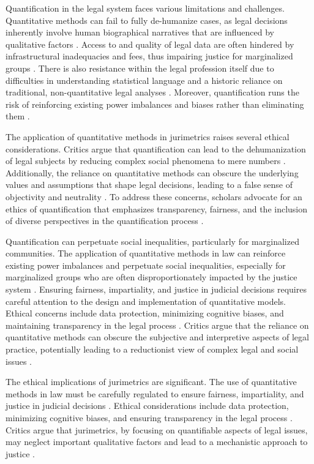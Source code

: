 Quantification in the legal system faces various limitations and challenges. Quantitative methods can fail to fully de-humanize cases, as legal decisions inherently involve human biographical narratives that are influenced by qualitative factors \cite{lynch2019, lynch2019}. Access to and quality of legal data are often hindered by infrastructural inadequacies and fees, thus impairing justice for marginalized groups \cite{ribeiro2021}. There is also resistance within the legal profession itself due to difficulties in understanding statistical language and a historic reliance on traditional, non-quantitative legal analyses \cite{maia2019, ribeiro2021}. Moreover, quantification runs the risk of reinforcing existing power imbalances and biases rather than eliminating them \cite{lynch2019}.

The application of quantitative methods in jurimetrics raises several ethical considerations. Critics argue that quantification can lead to the dehumanization of legal subjects by reducing complex social phenomena to mere numbers \cite{101111lsi12334}. Additionally, the reliance on quantitative methods can obscure the underlying values and assumptions that shape legal decisions, leading to a false sense of objectivity and neutrality \cite{101057s4159902003965}. To address these concerns, scholars advocate for an ethics of quantification that emphasizes transparency, fairness, and the inclusion of diverse perspectives in the quantification process \cite{101007s1102402209481_w}.

Quantification can perpetuate social inequalities, particularly for marginalized communities. The application of quantitative methods in law can reinforce existing power imbalances and perpetuate social inequalities, especially for marginalized groups who are often disproportionately impacted by the justice system \cite{10.1590/data.2022.65.3.267,10.1057/s41599-020-00557-0}. Ensuring fairness, impartiality, and justice in judicial decisions requires careful attention to the design and implementation of quantitative models. Ethical concerns include data protection, minimizing cognitive biases, and maintaining transparency in the legal process \cite{silva2023role}. Critics argue that the reliance on quantitative methods can obscure the subjective and interpretive aspects of legal practice, potentially leading to a reductionist view of complex legal and social issues \cite{1023071190721}.

The ethical implications of jurimetrics are significant. The use of quantitative methods in law must be carefully regulated to ensure fairness, impartiality, and justice in judicial decisions \cite{silva2023role}. Ethical considerations include data protection, minimizing cognitive biases, and ensuring transparency in the legal process \cite{silva2023role}. Critics argue that jurimetrics, by focusing on quantifiable aspects of legal issues, may neglect important qualitative factors and lead to a mechanistic approach to justice \cite{ribeiro2021quantification}.

